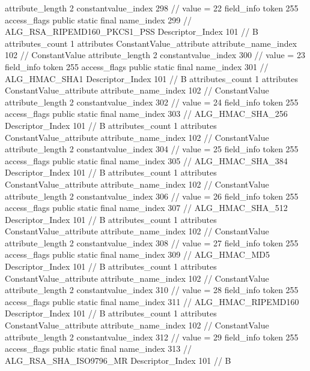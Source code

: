 {{{{{{{					attribute_length	2
					constantvalue_index	298		// value = 22
				}
				}
			}
			field_info {
				token	255
				access_flags	public static final
				name_index	299		// ALG_RSA_RIPEMD160_PKCS1_PSS
				Descriptor_Index	101		// B
				attributes_count	1
				attributes {
				ConstantValue_attribute {
					attribute_name_index	102		// ConstantValue
					attribute_length	2
					constantvalue_index	300		// value = 23
				}
				}
			}
			field_info {
				token	255
				access_flags	public static final
				name_index	301		// ALG_HMAC_SHA1
				Descriptor_Index	101		// B
				attributes_count	1
				attributes {
				ConstantValue_attribute {
					attribute_name_index	102		// ConstantValue
					attribute_length	2
					constantvalue_index	302		// value = 24
				}
				}
			}
			field_info {
				token	255
				access_flags	public static final
				name_index	303		// ALG_HMAC_SHA_256
				Descriptor_Index	101		// B
				attributes_count	1
				attributes {
				ConstantValue_attribute {
					attribute_name_index	102		// ConstantValue
					attribute_length	2
					constantvalue_index	304		// value = 25
				}
				}
			}
			field_info {
				token	255
				access_flags	public static final
				name_index	305		// ALG_HMAC_SHA_384
				Descriptor_Index	101		// B
				attributes_count	1
				attributes {
				ConstantValue_attribute {
					attribute_name_index	102		// ConstantValue
					attribute_length	2
					constantvalue_index	306		// value = 26
				}
				}
			}
			field_info {
				token	255
				access_flags	public static final
				name_index	307		// ALG_HMAC_SHA_512
				Descriptor_Index	101		// B
				attributes_count	1
				attributes {
				ConstantValue_attribute {
					attribute_name_index	102		// ConstantValue
					attribute_length	2
					constantvalue_index	308		// value = 27
				}
				}
			}
			field_info {
				token	255
				access_flags	public static final
				name_index	309		// ALG_HMAC_MD5
				Descriptor_Index	101		// B
				attributes_count	1
				attributes {
				ConstantValue_attribute {
					attribute_name_index	102		// ConstantValue
					attribute_length	2
					constantvalue_index	310		// value = 28
				}
				}
			}
			field_info {
				token	255
				access_flags	public static final
				name_index	311		// ALG_HMAC_RIPEMD160
				Descriptor_Index	101		// B
				attributes_count	1
				attributes {
				ConstantValue_attribute {
					attribute_name_index	102		// ConstantValue
					attribute_length	2
					constantvalue_index	312		// value = 29
				}
				}
			}
			field_info {
				token	255
				access_flags	public static final
				name_index	313		// ALG_RSA_SHA_ISO9796_MR
				Descriptor_Index	101		// B
}}}}}
